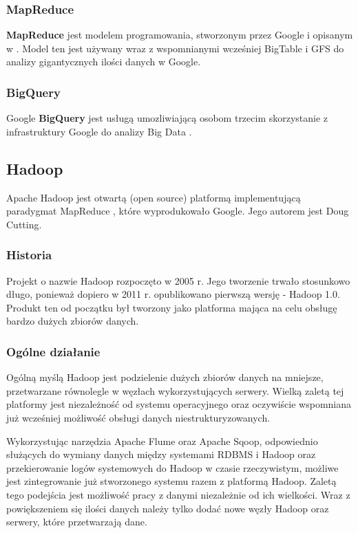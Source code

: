\subsubsection{MapReduce}
\label{ssub:mapreduce}
\textbf{MapReduce} jest modelem programowania, stworzonym przez Google i opisanym w \cite{dean08}. Model ten jest używany wraz z wspomnianymi wcześniej BigTable i GFS do analizy gigantycznych ilości danych w Google.

\subsubsection{BigQuery}
\label{ssub:bigquery}
Google \textbf{BigQuery} jest usługą umozliwiającą osobom trzecim skorzystanie z infrastruktury Google do analizy Big Data \cite{www:google-big-query}.

\subsection{Hadoop}
\label{ssub:hadoop}
Apache Hadoop jest otwartą (open source) platformą implementującą paradygmat MapReduce \cite{dean08}, które wyprodukowało Google. Jego autorem jest Doug Cutting.

\subsubsection{Historia}
\label{ssub:hadoop_historia}
Projekt o nazwie Hadoop rozpoczęto w 2005 r. Jego tworzenie trwało stosunkowo długo, ponieważ dopiero  w 2011 r. opublikowano pierwszą wersję - Hadoop 1.0. Produkt ten od początku był tworzony jako platforma mająca na celu obsługę bardzo dużych zbiorów danych. 

\subsubsection{Ogólne działanie}
\label{ssub:ogolne_dzialanie}
Ogólną myślą Hadoop jest podzielenie dużych zbiorów danych na mniejsze, przetwarzane równolegle w węzłach wykorzystujących serwery. Wielką zaletą tej platformy jest niezależność od systemu operacyjnego oraz oczywiście wspomniana już wcześniej możliwość obsługi danych niestrukturyzowanych.

Wykorzystując narzędzia Apache Flume oraz Apache Sqoop, odpowiednio służących do wymiany danych między systemami RDBMS i Hadoop oraz przekierowanie logów systemowych do Hadoop w czasie rzeczywistym, możliwe jest zintegrowanie już stworzonego systemu razem z platformą Hadoop. Zaletą tego podejścia jest możliwość pracy z danymi niezależnie od ich wielkości. Wraz z powiększeniem się ilości danych należy tylko dodać nowe węzły Hadoop oraz serwery, które przetwarzają dane.

